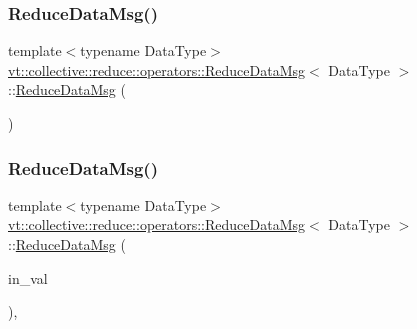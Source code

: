 \mbox{\label{structvt_1_1collective_1_1reduce_1_1operators_1_1_reduce_data_msg_ad5efa5f9fcee6b893ba873603bf56503}} 
\subsubsection{\texorpdfstring{Reduce\+Data\+Msg()}{ReduceDataMsg()}\hspace{0.1cm}{\footnotesize\ttfamily [3/5]}}
{\footnotesize\ttfamily template$<$typename Data\+Type$>$ \\
\hyperlink{structvt_1_1collective_1_1reduce_1_1operators_1_1_reduce_data_msg}{vt\+::collective\+::reduce\+::operators\+::\+Reduce\+Data\+Msg}$<$ Data\+Type $>$\+::\hyperlink{structvt_1_1collective_1_1reduce_1_1operators_1_1_reduce_data_msg}{Reduce\+Data\+Msg} (\begin{DoxyParamCaption}\item[{\hyperlink{structvt_1_1collective_1_1reduce_1_1operators_1_1_reduce_data_msg}{Reduce\+Data\+Msg}$<$ Data\+Type $>$ \&\&}]{ }\end{DoxyParamCaption})\hspace{0.3cm}{\ttfamily [default]}}

\mbox{\label{structvt_1_1collective_1_1reduce_1_1operators_1_1_reduce_data_msg_af154e207e5fbafd8e78baa5986410b34}} 
\subsubsection{\texorpdfstring{Reduce\+Data\+Msg()}{ReduceDataMsg()}\hspace{0.1cm}{\footnotesize\ttfamily [4/5]}}
{\footnotesize\ttfamily template$<$typename Data\+Type$>$ \\
\hyperlink{structvt_1_1collective_1_1reduce_1_1operators_1_1_reduce_data_msg}{vt\+::collective\+::reduce\+::operators\+::\+Reduce\+Data\+Msg}$<$ Data\+Type $>$\+::\hyperlink{structvt_1_1collective_1_1reduce_1_1operators_1_1_reduce_data_msg}{Reduce\+Data\+Msg} (\begin{DoxyParamCaption}\item[{Data\+Type \&\&}]{in\+\_\+val }\end{DoxyParamCaption})\hspace{0.3cm}{\ttfamily [inline]}, {\ttfamily [explicit]}}

